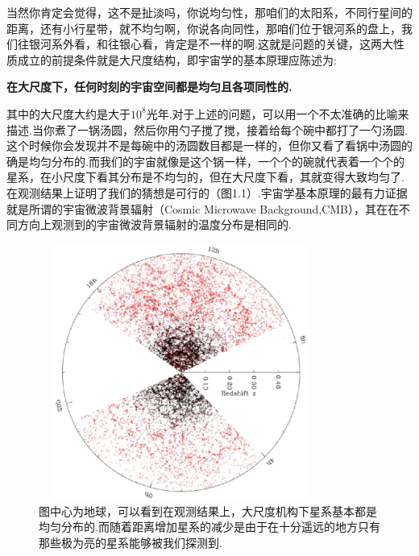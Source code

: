 \documentclass[a4paper]{book}
\begin{document}
 当然你肯定会觉得，这不是扯淡吗，你说均匀性，那咱们的太阳系，不同行星间的距离，还有小行星带，就不均匀啊，你说各向同性，那咱们位于银河系的盘上，我们往银河系外看，和往银心看，肯定是不一样的啊.这就是问题的关键，这两大性质成立的前提条件就是大尺度结构，即宇宙学的基本原理应陈述为:\par 
 \centerline{\textbf{在大尺度下，任何时刻的宇宙空间都是均匀且各项同性的.}}\par 
 其中的大尺度大约是大于$10^8$光年.对于上述的问题，可以用一个不太准确的比喻来描述.当你煮了一锅汤圆，然后你用勺子搅了搅，接着给每个碗中都打了一勺汤圆.这个时候你会发现并不是每碗中的汤圆数目都是一样的，但你又看了看锅中汤圆的确是均匀分布的.而我们的宇宙就像是这个锅一样，一个个的碗就代表着一个个的星系，在小尺度下看其分布是不均匀的，但在大尺度下看，其就变得大致均匀了.在观测结果上证明了我们的猜想是可行的（图1.1）.宇宙学基本原理的最有力证据就是所谓的宇宙微波背景辐射（Cosmic Microwave Background,CMB），其在在不同方向上观测到的宇宙微波背景辐射的温度分布是相同的. \par
 \begin{figure}[!h]
	\centering
	\includegraphics[width=9.36cm,height=8.4cm]{figures/宇宙的大尺度结构.eps}
     \caption{图中心为地球，可以看到在观测结果上，大尺度机构下星系基本都是均匀分布的.而随着距离增加星系的减少是由于在十分遥远的地方只有那些极为亮的星系能够被我们探测到.}
\end{figure} \par
\end{document}
